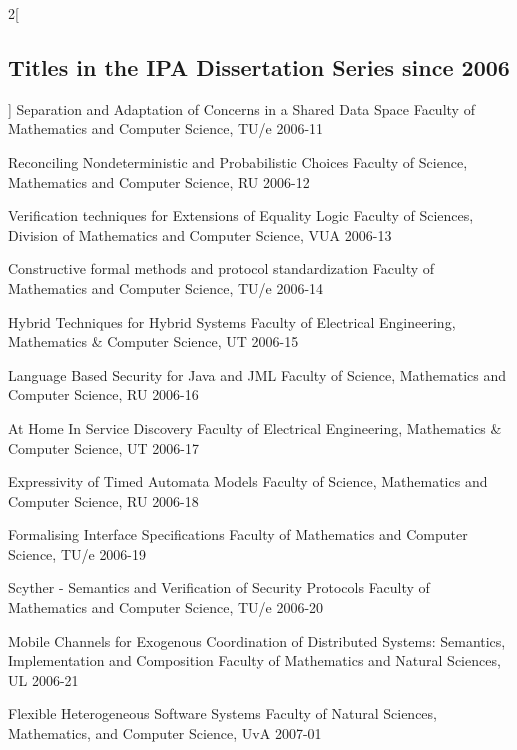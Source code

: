 \begin{multicols}{2}[\subsection*{Titles in the IPA Dissertation Series since 2006}]
         {Separation and Adaptation of Concerns in a Shared Data Space}
         {Faculty of Mathematics and Computer Science, TU/e}
         {2006-11}

         {Reconciling Nondeterministic and Probabilistic Choices}
         {Faculty of Science, Mathematics and Computer Science, RU}
         {2006-12}

         {Verification techniques for Extensions of Equality Logic}
         {Faculty of Sciences, Division of Mathematics and Computer Science, VUA}
         {2006-13}

         {Constructive formal methods and protocol standardization}
         {Faculty of Mathematics and Computer Science, TU/e}
         {2006-14}

         {Hybrid Techniques for Hybrid Systems}
         {Faculty of Electrical Engineering, Mathematics \& Computer Science, UT}
         {2006-15}

         {Language Based Security for Java and JML}
         {Faculty of Science, Mathematics and Computer Science, RU}
         {2006-16}

         {At Home In Service Discovery}
         {Faculty of Electrical Engineering, Mathematics \& Computer Science, UT}
         {2006-17}

         {Expressivity of Timed Automata Models}
         {Faculty of Science, Mathematics and Computer Science, RU}
         {2006-18}

         {Formalising Interface Specifications}
         {Faculty of Mathematics and Computer Science, TU/e}
         {2006-19}

         {Scyther - Semantics and Verification of Security Protocols}
         {Faculty of Mathematics and Computer Science, TU/e}
         {2006-20}

         {Mobile Channels for Exogenous Coordination of Distributed Systems: Semantics, Implementation and Composition}
         {Faculty of Mathematics and Natural Sciences, UL}
         {2006-21}

         {Flexible Heterogeneous Software Systems}
         {Faculty of Natural Sciences, Mathematics, and Computer Science, UvA}
         {2007-01}


\end{multicols}
